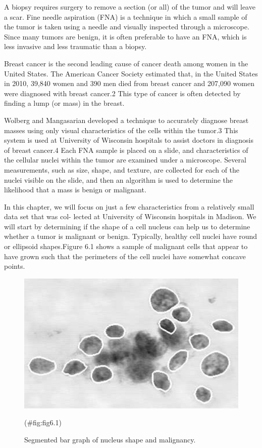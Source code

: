 \documentclass[
]{report}
\begin{document}
A biopsy requires surgery to remove a section (or all) of the tumor and will leave a scar. Fine needle
aspiration (FNA) is a technique in which a small sample of the tumor is taken using a needle and visually
inspected through a microscope. Since many tumors are benign, it is often preferable to have an FNA, which
is less invasive and less traumatic than a biopsy.

Breast cancer is the second leading cause of cancer death among women in the United States. The
American Cancer Society estimated that, in the United States in 2010, 39,840 women and 390 men died from
breast cancer and 207,090 women were diagnosed with breast cancer.2 This type of cancer is often detected
by finding a lump (or mass) in the breast.

Wolberg and Mangasarian developed a technique to accurately diagnose breast masses using only visual
characteristics of the cells within the tumor.3 This system is used at University of Wisconsin hospitals to assist
doctors in diagnosis of breast cancer.4 Each FNA sample is placed on a slide, and characteristics of the cellular
nuclei within the tumor are examined under a microscope. Several measurements, such as size, shape, and
texture, are collected for each of the nuclei visible on the slide, and then an algorithm is used to determine the
likelihood that a mass is benign or malignant.

In this chapter, we will focus on just a few characteristics from a relatively small data set that was col-
lected at University of Wisconsin hospitals in Madison. We will start by determining if the shape of a cell
nucleus can help us to determine whether a tumor is malignant or benign.
Typically, healthy cell nuclei have round or ellipsoid shapes.Figure 6.1 shows a sample of malignant cells that appear to have grown such that the perimeters of the cell nuclei have somewhat concave points.

\begin{figure}

{\centering \includegraphics[width=0.8\linewidth]{docs/Fig6_1Cells} 

}

\caption{Segmented bar graph of nucleus shape and malignancy.}(\#fig:fig6.1)
\end{figure}
\end{document}
